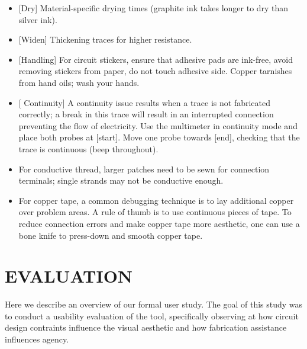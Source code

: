 \documentclass{sigchi}
\begin{document}
        \begin{itemize}   
          \item {[}Dry{]} Material-specific drying times (graphite ink takes longer to dry than silver ink). 
          \item {[}Widen{]} Thickening traces for higher resistance. 
          \item {[}Handling{]} For circuit stickers, ensure that adhesive pads are ink-free, avoid removing stickers from paper, do not touch adhesive side. Copper tarnishes from hand oils; wash your hands. 
          \item {[} Continuity{]} A continuity issue results when a trace is not fabricated correctly; a break in this trace will result in an interrupted connection preventing the flow of electricity. Use the multimeter in continuity mode and place both probes at [start]. Move one probe towards [end], checking that the trace is continuous (beep throughout).  
          \item For conductive thread, larger patches need to be sewn for connection terminals; single strands may not be conductive enough. 
          \item For copper tape, a common debugging technique is to lay additional copper over problem areas. A rule of thumb is to use continuous pieces of tape. To reduce connection errors and make copper tape more aesthetic, one can use a bone knife to press-down and smooth copper tape. 
        \end{itemize}

\section{EVALUATION}
    Here we describe an overview of our formal user study. The goal of this study was to conduct a usability evaluation of the tool, specifically observing at how circuit design contraints influence the visual aesthetic and how fabrication assistance influences agency. 
\end{document}

